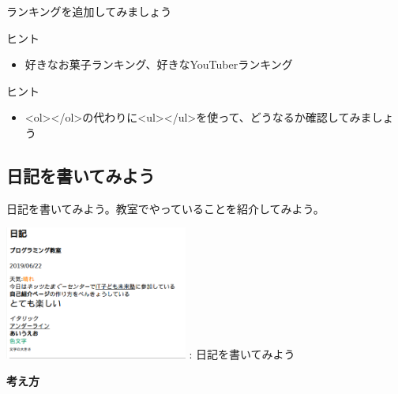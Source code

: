 \documentclass[a4paper,12pt]{jarticle}
\begin{document}
\bigskip


\bigskip


\bigskip


\theQuestion\label{Q:hasAnswer04-6}

ランキングを追加してみましょう

ヒント

\begin{itemize}
  \item
        好きなお菓子ランキング、好きなYouTuberランキング
\end{itemize}


\bigskip

\bigskip

\theQuestion\label{Q:hasAnswer04-7}

ヒント

\begin{itemize}
  \item
        {\textless}ol{\textgreater}{\textless}/ol{\textgreater}の代わりに{\textless}ul{\textgreater}{\textless}/ul{\textgreater}を使って、どうなるか確認してみましょう
\end{itemize}



\bigskip

\clearpage
{}
\subsection{\theExercise 日記を書いてみよう}
日記を書いてみよう。教室でやっていることを紹介してみよう。

\centering
\begin{minipage}{6.32cm}
  {\upshape
    \includegraphics[width=0.45\textwidth]{textbook-img185.png}
    \newline
    : 日記を書いてみよう}
\end{minipage}

\bigskip

\flushleft
\textbf{考え方}
\end{document}
